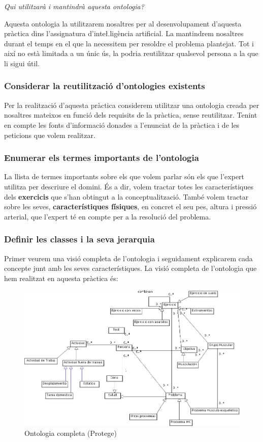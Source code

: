 \documentclass[a4paper, 12pt, UTF8]{article}
\begin{document}
\emph{Qui utilitzarà i mantindrà aquesta ontologia?}

Aquesta ontologia la utilitzarem nosaltres per al desenvolupament d'aquesta pràctica dins l'assignatura d'inte\l.ligència artificial. La mantindrem nosaltres durant el temps en el que la necessitem per resoldre el problema plantejat. Tot i així no està limitada a un únic ús, la podria reutilitzar qualsevol persona a la que li sigui útil.

\subsubsection{Considerar la reutilització d'ontologies existents}

Per la realització d'aquesta pràctica considerem utilitzar una ontologia creada per nosaltres mateixos en funció dels requisits de la pràctica, sense reutilitzar. Tenint en compte les fonts d'informació donades a l'enunciat de la pràctica i de les peticions que volem realitzar.

\subsubsection{Enumerar els termes importants de l'ontologia}

La llista de termes importants sobre els que volem parlar són els que l'expert utilitza per descriure el domini. És a dir, volem tractar totes les característiques dels \textbf{exercicis} que s'han obtingut a la conceptualització. També volem tractar sobre les seves, \textbf{característiques físiques}, en concret el seu pes, altura i pressió arterial, que l'expert té en compte per a la resolució del problema. 

\subsubsection{Definir les classes i la seva jerarquia}

Primer veurem una visió completa de l'ontologia i seguidament explicarem cada concepte junt amb les seves característiques. La visió completa de l'ontologia que hem realitzat en aquesta pràctica és:

\begin{figure}[h!]
	\centering
	\includegraphics[width=\textwidth]{mainUML}
	\caption{Ontologia completa (Protege)}
\end{figure}
\end{document}

